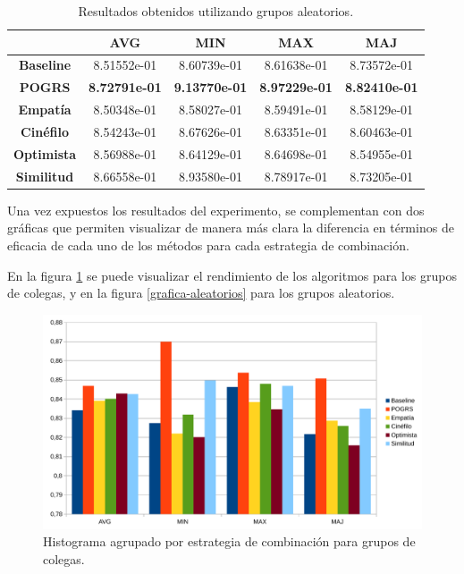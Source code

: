 \begin{table}[H]
	\centering
	\begin{tabular}{ccccc}
		\toprule
		{} & \textbf{AVG} & \textbf{MIN} & \textbf{MAX} & \textbf{MAJ} \\
		\midrule
		\textbf{Baseline} & 8.51552e-01 & 8.60739e-01 & 8.61638e-01 & 8.73572e-01 \\
		\midrule
		\textbf{POGRS} & \textbf{8.72791e-01} & \textbf{9.13770e-01} & \textbf{8.97229e-01} & \textbf{8.82410e-01} \\
		\midrule
		\textbf{Empatía} & 8.50348e-01 & 8.58027e-01 & 8.59491e-01 & 8.58129e-01 \\
		\textbf{Cinéfilo} & 8.54243e-01 & 8.67626e-01 & 8.63351e-01 & 8.60463e-01 \\
		\textbf{Optimista} & 8.56988e-01 & 8.64129e-01 & 8.64698e-01 & 8.54955e-01 \\
		\textbf{Similitud} & 8.66558e-01 & 8.93580e-01 & 8.78917e-01 & 8.73205e-01 \\
		\bottomrule
	\end{tabular}
	\caption{Resultados obtenidos utilizando grupos aleatorios.}
	\label{t:resultados-aleatorios}
\end{table}

Una vez expuestos los resultados del experimento, se complementan con dos gráficas que permiten visualizar de manera más clara la diferencia en términos de eficacia de cada uno de los métodos para cada estrategia de combinación.

En la figura \ref{grafica-colegas} se puede visualizar el rendimiento de los algoritmos para los grupos de colegas, y en la figura \ref{grafica-aleatorios} para los grupos aleatorios.

\begin{figure}[H]
	\centering
	\includegraphics[scale=0.6]{imagenes/grafica-colegas.pdf}
	\caption{Histograma agrupado por estrategia de combinación para grupos de colegas.}
	\label{grafica-colegas}
\end{figure}

